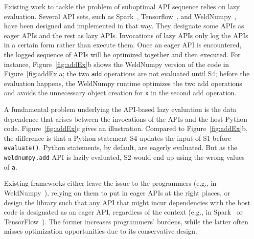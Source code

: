 \documentclass[sigconf]{acmart}\settopmatter{printfolios=true,printccs=false,printacmref=false}\setcopyright{none}
\begin{document}
Existing work to tackle the problem of suboptimal API sequence relies on lazy evaluation. Several API sets, such as Spark~\cite{Zaharia:2010}, Tensorflow~\cite{abadi2016tensorflow}, and WeldNumpy~\cite{palkar2017weld}, have been designed and implemented in that way. They designate some APIs as eager APIs and the rest as lazy APIs. Invocations of lazy APIs only log the APIs in a certain form rather than execute them. Once an eager API is encountered, the logged sequence of APIs will be optimized together and then executed. For instance, Figure~\ref{fig:addEx}b shows the WeldNumpy version of the code in Figure~\ref{fig:addEx}a; the two \texttt{add} operations are not evaluated until S4; before the evaluation happens, the WeldNumpy runtime optimizes the two add operations and avoids the unnecessary object creation for \texttt{x} in the second add operation.  

A fundamental problem underlying the API-based lazy evaluation is the data dependence that arises between the invocations of the APIs and the host Python code. Figure~\ref{fig:addEx}c gives an illustration. Compared to Figure~\ref{fig:addEx}b, the difference is that a Python statement S4 updates the input of S1 before \texttt{evaluate()}. Python statements, by default, are eagerly evaluated. But as the \texttt{weldnumpy.add} API is lazily evaluated, S2 would end up using the wrong values of \texttt{a}.  

Existing frameworks either leave the issue to the programmers (e.g., in WeldNumpy~\cite{palkar2017weld}), relying on them to put in eager APIs at the right places, or design the library such that any API that might incur dependencies with the host code is designated as an eager API, regardless of the context (e.g., in Spark~\cite{Zaharia:2010} or TensorFlow~\cite{abadi2016tensorflow}). The former increases programmers' burdens, while the latter often misses optimization opportunities due to its conservative design.
\end{document}
